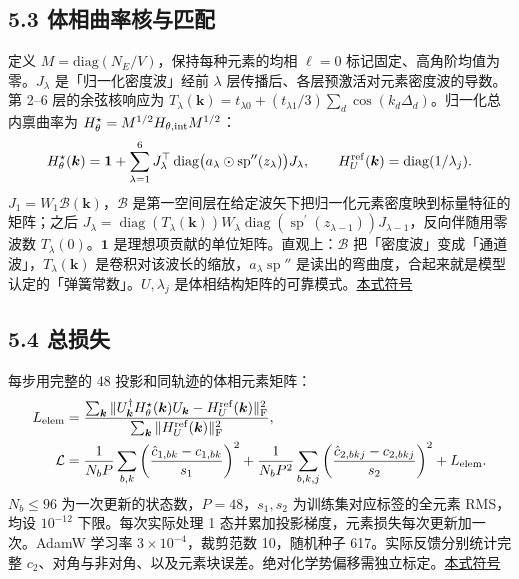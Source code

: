 \documentclass[UTF8,fontset=none,10pt,a4paper]{ctexart}
\newcommand{\sd}[1]{\hfill\mbox{\footnotesize\hyperlink{sym:#1}{本式符号}}\par}
\begin{document}
\subsection*{5.3 体相曲率核与匹配}
定义 $M=\mathrm{diag}(N_E/V)$，保持每种元素的均相 $\ell=0$ 标记固定、高角阶均值为零。$J_\lambda$ 是「归一化密度波」经前 $\lambda$ 层传播后、各层预激活对元素密度波的导数。第 2–6 层的余弦核响应为 $T_\lambda(\bm k)=t_{\lambda0}+(t_{\lambda1}/3)\sum_d\cos(k_d\Delta_d)$。归一化总内禀曲率为 $H^\star_\theta=M^{1/2}H_{\theta,\rm int}M^{1/2}$：
\begin{equation}\label{e:bulk}
 H^\star_\theta(\bm k)=\mathbf 1+\sum_{\lambda=1}^6
   J_\lambda^\top\,\mathrm{diag}\big(a_\lambda\odot\operatorname{sp}''(z_\lambda)\big)J_\lambda,
 \qquad H_U^{\rm ref}(\bm k)=\mathrm{diag}(1/\lambda_j).
\end{equation}
$J_1=W_1\mathcal B(\bm k)$，$\mathcal B$ 是第一空间层在给定波矢下把归一化元素密度映到标量特征的矩阵；之后 $J_\lambda=\operatorname{diag}(T_\lambda(\bm k))W_\lambda\operatorname{diag}(\operatorname{sp}^\prime(z_{\lambda-1}))J_{\lambda-1}$，反向伴随用零波数 $T_\lambda(0)$。$\mathbf 1$ 是理想项贡献的单位矩阵。直观上：$\mathcal B$ 把「密度波」变成「通道波」，$T_\lambda(\bm k)$ 是卷积对该波长的缩放，$a_\lambda\operatorname{sp}''$ 是读出的弯曲度，合起来就是模型认定的「弹簧常数」。$U,\lambda_j$ 是体相结构矩阵的可靠模式。\sd{e:bulk}

\subsection*{5.4 总损失}
每步用完整的 48 投影和同轨迹的体相元素矩阵：
\begin{equation}\label{e:loss}
 \begin{aligned}
 L_{\rm elem}&=
 \frac{\sum_{\bm k}\|U_{\bm k}^\dagger H^\star_\theta(\bm k)U_{\bm k}
                         -H^{\rm ref}_U(\bm k)\|_{\rm F}^{2}}
      {\sum_{\bm k}\|H^{\rm ref}_U(\bm k)\|_{\rm F}^{2}},\\
 {\cal L}&=\frac1{N_bP}\sum_{b,k}\left(\frac{\hat c_{1,bk}-c_{1,bk}}{s_1}\right)^2
 +\frac1{N_bP^2}\sum_{b,k,j}\left(\frac{\hat c_{2,bkj}-c_{2,bkj}}{s_2}\right)^2
 +L_{\rm elem}.
 \end{aligned}
\end{equation}
$N_b\le96$ 为一次更新的状态数，$P=48$，$s_1,s_2$ 为训练集对应标签的全元素 RMS，均设 $10^{-12}$ 下限。每次实际处理 1 态并累加投影梯度，元素损失每次更新加一次。AdamW 学习率 $3\times10^{-4}$，裁剪范数 10，随机种子 617。实际反馈分别统计完整 $c_2$、对角与非对角、以及元素块误差。绝对化学势偏移需独立标定。\sd{e:loss}
\end{document}
